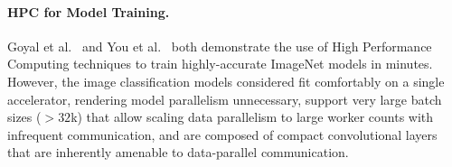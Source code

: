 \paragraph{HPC for Model Training.} Goyal et al.~\cite{goyal2017accurate} and You et al.~\cite{you2018imagenet} both demonstrate the use of High Performance Computing techniques to train highly-accurate ImageNet models in minutes. However, the image classification models considered fit comfortably on a single accelerator, rendering model parallelism unnecessary, support very large batch sizes ($>32$k) that allow scaling data parallelism to large worker counts with infrequent communication, and are composed of compact convolutional layers that are inherently amenable to data-parallel communication.
